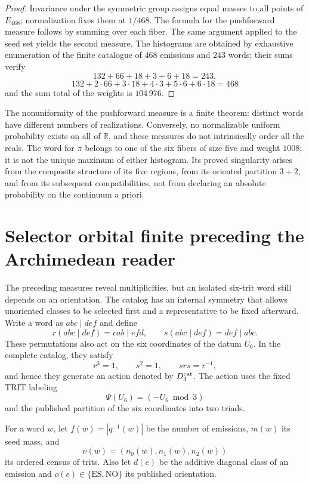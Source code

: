 \begin{proof}
Invariance under the symmetric group assigns equal masses to all
points of \(E_{468}\); normalization fixes them at \(1/468\). The formula for
the pushforward measure follows by summing over each fiber. The same argument applied to the
seed set yields the second measure. The histograms are obtained
by exhaustive enumeration of the finite catalogue of \(468\) emissions and \(243\)
words; their sums verify
\[
132+66+18+3+6+18=243,
\]
\[
132+2\cdot66+3\cdot18+4\cdot3+5\cdot6+6\cdot18=468
\]
and the sum total of the weights is \(104\,976\).
\end{proof}

The nonuniformity of the pushforward measure is a finite theorem: distinct words have different numbers of realizations. Conversely, no normalizable uniform probability exists on all of \(\mathbb R\), and these measures do not intrinsically order all the reals. The word for \(\pi\) belongs to one of the six fibers of size five and weight \(1008\); it is not the unique maximum of either histogram. Its proved singularity arises from the composite structure of its five regions, from its oriented partition \(3+2\), and from its subsequent compatibilities, not from declaring an absolute probability on the continuum a priori.

\section{Selector orbital finite preceding the Archimedean reader}
\label{sec:selector-orbital-constantes}

The preceding measures reveal multiplicities, but an isolated six-trit word
still depends on an orientation. The catalog has an internal symmetry that
allows unoriented classes to be selected first and a representative to be fixed afterward.
Write a word as \(abc\mid def\) and define
\[
 r(abc\mid def)=cab\mid efd,
 \qquad
 s(abc\mid def)=def\mid abc.
\]
These permutations also act on the six coordinates of the datum
\(U_6\). In the complete catalog, they satisfy
\[
 r^3=1,
 \qquad s^2=1,
 \qquad srs=r^{-1},
\]
and hence they generate an action denoted by \(D_3^{\rm cat}\). The action uses
the fixed TRIT labeling
\[
 \Psi(U_6)=(-U_6\bmod3)
\]
and the published partition of the six coordinates into two triads.

For a word \(w\), let \(f(w)=|q^{-1}(w)|\) be the number of emissions,
\(m(w)\) its seed mass, and
\[
 \nu(w)=(n_0(w),n_1(w),n_2(w))
\]
its ordered census of trits. Also let \(d(e)\) be the additive diagonal class of
an emission and \(o(e)\in\{\mathrm{ES},\mathrm{NO}\}\) its published
orientation.

